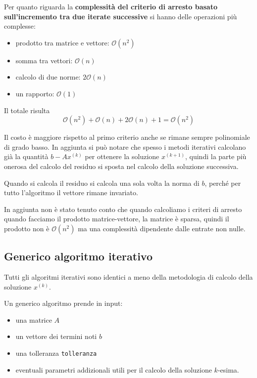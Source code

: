 Per quanto riguarda la \textbf{complessità del criterio di arresto basato sull'incremento tra due
    iterate successive} si hanno delle operazioni più complesse:
\begin{itemize}
    \item prodotto tra matrice e vettore: $\mathcal{O}(n^2)$
    \item somma tra vettori: $\mathcal{O}(n)$
    \item calcolo di due norme: $2\mathcal{O}(n)$
    \item un rapporto: $\mathcal{O}(1)$
\end{itemize}
Il totale risulta
$$\mathcal{O}(n^2)+ \mathcal{O}(n)+2\mathcal{O}(n)+1 = \mathcal{O}(n^2)$$

Il costo è maggiore rispetto al primo criterio anche se rimane sempre polinomiale
di grado basso. In aggiunta si può notare che spesso i metodi iterativi calcolano
già la quantità $b-Ax^{(k)}$ per ottenere la soluzione $x^{(k+1)}$, quindi la parte
più onerosa del calcolo del residuo si sposta nel calcolo della soluzione successiva.

\begin{nota}
    Quando si calcola il residuo si calcola una sola volta la norma di $b$, perché
    per tutto l'algoritmo il vettore rimane invariato.
\end{nota}

\begin{nota}
    In aggiunta non è stato tenuto conto che quando calcoliamo i criteri di arresto
    quando facciamo il prodotto matrice-vettore, la matrice è sparsa, quindi
    il prodotto non è $\mathcal{O}(n^2)$ ma una complessità dipendente dalle entrate
    non nulle.
\end{nota}

\subsection{Generico algoritmo iterativo}
Tutti gli algoritmi iterativi sono identici a meno della metodologia di calcolo
della soluzione $x^{(k)}$.

Un generico algoritmo prende in input:
\begin{itemize}
    \item una matrice $A$
    \item un vettore dei termini noti $b$
    \item una tolleranza \texttt{tolleranza}
    \item eventuali parametri addizionali utili per il calcolo della soluzione
          $k$-esima.
\end{itemize}

